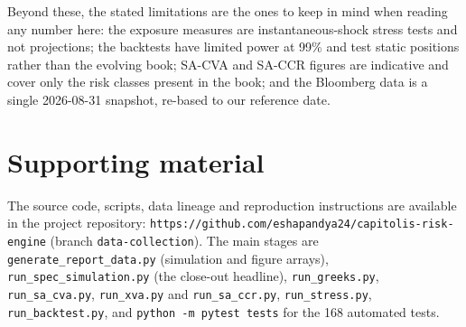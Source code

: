 \documentclass[11pt,letterpaper]{article}
\begin{document}
Beyond these, the stated limitations are the ones to keep in mind when reading any number here: the exposure measures are instantaneous-shock stress tests and not projections; the backtests have limited power at 99\% and test static positions rather than the evolving book; SA-CVA and SA-CCR figures are indicative and cover only the risk classes present in the book; and the Bloomberg data is a single 2026-08-31 snapshot, re-based to our reference date.

\section*{Supporting material}
The source code, scripts, data lineage and reproduction instructions are available in the project repository: \texttt{https://github.com/eshapandya24/capitolis-risk-engine} (branch \texttt{data-collection}). The main stages are \texttt{generate\_report\_data.py} (simulation and figure arrays), \texttt{run\_spec\_simulation.py} (the close-out headline), \texttt{run\_greeks.py}, \texttt{run\_sa\_cva.py}, \texttt{run\_xva.py} and \texttt{run\_sa\_ccr.py}, \texttt{run\_stress.py}, \texttt{run\_backtest.py}, and \texttt{python -m pytest tests} for the 168 automated tests.
\end{document}
